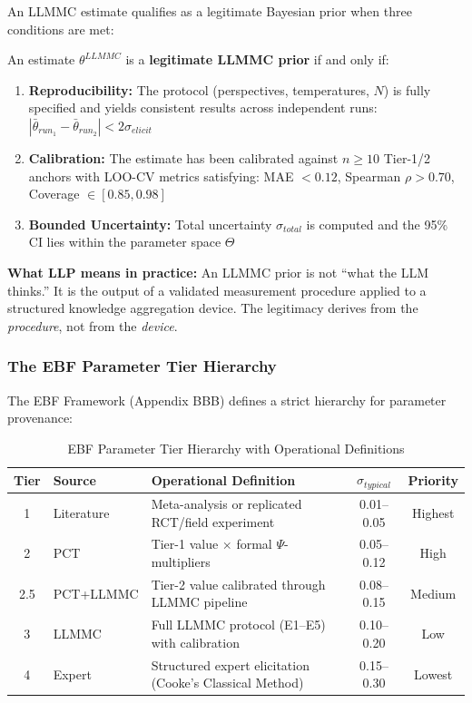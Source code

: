 An LLMMC estimate qualifies as a legitimate Bayesian prior when three conditions are met:

\begin{definition}
\label{def:llp}
An estimate $\theta^{LLMMC}$ is a \textbf{legitimate LLMMC prior} if and only if:
\begin{enumerate}
    \item[\textbf{LLP-1}] \textbf{Reproducibility:} The protocol (perspectives, temperatures, $N$)
    is fully specified and yields consistent results across independent runs:
    $|\bar{\theta}_{run_1} - \bar{\theta}_{run_2}| < 2\sigma_{elicit}$
    \item[\textbf{LLP-2}] \textbf{Calibration:} The estimate has been calibrated against
    $n \geq 10$ Tier-1/2 anchors with LOO-CV metrics satisfying: MAE $< 0.12$,
    Spearman $\rho > 0.70$, Coverage $\in [0.85, 0.98]$
    \item[\textbf{LLP-3}] \textbf{Bounded Uncertainty:} Total uncertainty $\sigma_{total}$ is
    computed and the 95\% CI lies within the parameter space $\Theta$
\end{enumerate}
\end{definition}

\textbf{What LLP means in practice:} An LLMMC prior is not ``what the LLM thinks.''
It is the output of a validated measurement procedure applied to a structured knowledge
aggregation device. The legitimacy derives from the \textit{procedure}, not from the \textit{device}.

\subsubsection{The EBF Parameter Tier Hierarchy}
\label{sec:AN-tier-hierarchy}

The EBF Framework (Appendix BBB) defines a strict hierarchy for parameter provenance:

\begin{table}[htbp]
\centering
\caption{EBF Parameter Tier Hierarchy with Operational Definitions}
\label{tab:tier-hierarchy}
\small
\begin{tabular}{@{}clp{5.5cm}cc@{}}
\toprule
\textbf{Tier} & \textbf{Source} & \textbf{Operational Definition} & \textbf{$\sigma_{typical}$} & \textbf{Priority} \\
\midrule
1 & Literature & Meta-analysis or replicated RCT/field experiment & 0.01--0.05 & Highest \\
2 & PCT & Tier-1 value $\times$ formal $\Psi$-multipliers & 0.05--0.12 & High \\
2.5 & PCT+LLMMC & Tier-2 value calibrated through LLMMC pipeline & 0.08--0.15 & Medium \\
3 & LLMMC & Full LLMMC protocol (E1--E5) with calibration & 0.10--0.20 & Low \\
4 & Expert & Structured expert elicitation (Cooke's Classical Method) & 0.15--0.30 & Lowest \\
\bottomrule
\end{tabular}
\end{table}

